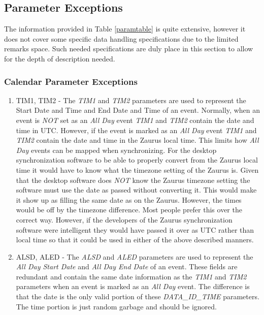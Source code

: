     \subsection{Parameter Exceptions}

    The information provided in Table \ref{paramtable} is quite extensive,
    however it does not cover some specific data handling specifications due
    to the limited remarks space. Such needed specifications are duly place in
    this section to allow for the depth of description needed.

    \subsubsection{Calendar Parameter Exceptions}

    \begin{enumerate}
      \item TIM1, TIM2 - The \emph{TIM1} and \emph{TIM2} parameters are used
      to represent the Start Date and Time and End Date and Time of an
      event. Normally, when an event is \emph{NOT} set as an \emph{All Day}
      event \emph{TIM1} and \emph{TIM2} contain the date and time in
      UTC. However, if the event is marked as an \emph{All Day} event
      \emph{TIM1} and \emph{TIM2} contain the date and time in the Zaurus
      local time. This limits how \emph{All Day} events can be mapped when
      synchronizing. For the desktop synchronization software to be able to
      properly convert from the Zaurus local time it would have to know what
      the timezone setting of the Zaurus is. Given that the desktop software
      does \emph{NOT} know the Zaurus timezone setting the software must use
      the date as passed without converting it. This would make it show up as
      filling the same date as on the Zaurus. However, the times would be off
      by the timezone difference. Most people prefer this over the correct
      way. However, if the developers of the Zaurus synchronization software
      were intelligent they would have passed it over as UTC rather than local
      time so that it could be used in either of the above described manners.

      \item ALSD, ALED - The \emph{ALSD} and \emph{ALED} parameters are used
      to represent the \emph{All Day Start Date} and \emph{All Day End Date}
      of an event. These fields are redundant and contain the same date
      information as the \emph{TIM1} and \emph{TIM2} parameters when an event
      is marked as an \emph{All Day} event. The difference is that the date is
      the only valid portion of these \emph{DATA\_ID\_TIME} parameters. The
      time portion is just random garbage and should be ignored.
    \end{enumerate}

